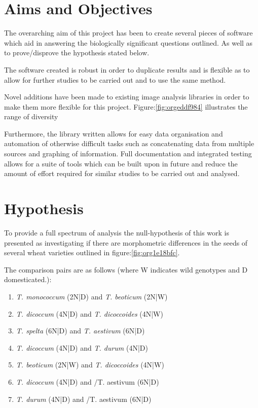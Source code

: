 \documentclass[11pt]{report}
\begin{document}
\section{Aims and Objectives}
\label{sec:orgc31df15}

The overarching aim of this project has been to create several pieces of software which aid in answering the biologically significant questions outlined. As well as to prove/disprove the hypothesis stated below.

The software created is robust in order to duplicate results and is flexible as to allow for further studies to be carried out and to use the same method.

Novel additions have been made to existing image analysis libraries in order to make them more flexible for this project. Figure:\ref{fig:orgeddf984} illustrates the range of diversity

Furthermore, the library written allows for easy data organisation and automation of otherwise difficult tasks such as concatenating data from multiple sources and graphing of information. Full documentation and integrated testing allows for a suite of tools which can be built upon in future and reduce the amount of effort required for similar studies to be carried out and analysed.

\section{Hypothesis}
\label{sec:orgacd3382}
To provide a full spectrum of analysis the null-hypothesis of this work is presented as investigating if there are morphometric differences in the seeds of several wheat varieties outlined in figure:\ref{fig:org1e18bfc}.

The comparison pairs are as follows (where W indicates wild genotypes and D domesticated.):

\begin{enumerate}
\item \emph{T. monococcum} (2N|D) and \emph{T. beoticum} (2N|W)
\item \emph{T. dicoccum} (4N|D) and \emph{T. dicoccoides} (4N|W)
\item \emph{T. spelta} (6N|D) and \emph{T. aestivum} (6N|D)
\item \emph{T. dicoccum} (4N|D) and \emph{T. durum} (4N|D)
\item \emph{T. beoticum} (2N|W) and \emph{T. dicoccoides} (4N|W)
\item \emph{T. dicoccum} (4N|D) and /T. aestivum (6N|D)
\item \emph{T. durum} (4N|D) and /T. aestivum (6N|D)
\end{enumerate}
\end{document}
